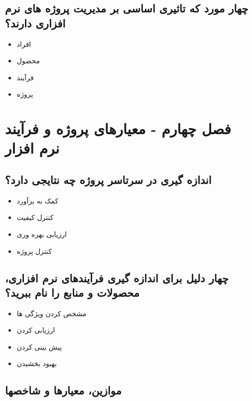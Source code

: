 \documentclass{article}
\begin{document}
\subsection{چهار مورد که تاثیری اساسی بر مدیریت پروژه های نرم افزاری دارند؟}

\begin{itemize}
	\item افراد
	\item محصول
	\item فرآیند
	\item پروژه
\end{itemize}



\section{فصل چهارم - معیارهای پروژه و فرآیند نرم افزار}


\subsection{اندازه گیری در سرتاسر پروژه چه نتایجی دارد؟}


\begin{itemize}
	\item کمک به برآورد
	\item کنترل کیفیت
	\item ارزیابی بهره وری
	\item کنترل پروژه
\end{itemize}



\subsection{چهار دلیل برای اندازه گیری فرآیندهای نرم افزاری، محصولات و منابع را نام ببرید؟}

\begin{itemize}
	\item مشخص کردن ویژگی ها
	\item ارزیابی کردن
	\item پیش بینی کردن
	\item بهبود بخشیدن
\end{itemize}


\newpage


\subsection{موازین، معیارها و شاخصها}
\end{document}
